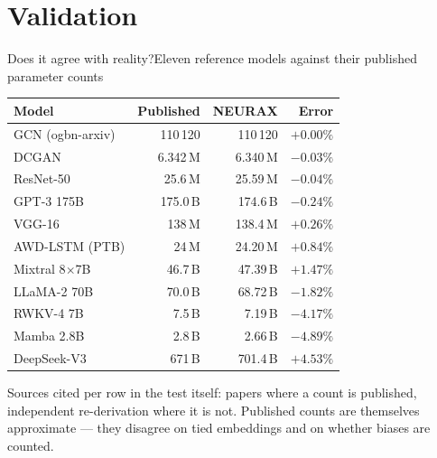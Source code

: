 \documentclass[aspectratio=169,11pt]{beamer}
\newcommand{\good}[1]{\textcolor{nxMoss}{#1}}
\begin{document}
\section{Validation}

\begin{frame}{Does it agree with reality?}{Eleven reference models against their published parameter counts}
  \vspace{0.15cm}
  \begin{center}
  {\footnotesize
  \begin{tabular}{@{}l r r r@{}}
    \toprule
    \textbf{Model} & \textbf{Published} & \textbf{NEURAX} & \textbf{Error} \\
    \midrule
    GCN (ogbn-arxiv) & 110\,120 & 110\,120 & \good{$+0.00\%$} \\
    DCGAN            & 6.342\,M & 6.340\,M & \good{$-0.03\%$} \\
    ResNet-50        & 25.6\,M  & 25.59\,M & \good{$-0.04\%$} \\
    GPT-3 175B       & 175.0\,B & 174.6\,B & \good{$-0.24\%$} \\
    VGG-16           & 138\,M   & 138.4\,M & \good{$+0.26\%$} \\
    AWD-LSTM (PTB)   & 24\,M    & 24.20\,M & \good{$+0.84\%$} \\
    Mixtral 8$\times$7B & 46.7\,B & 47.39\,B & \good{$+1.47\%$} \\
    LLaMA-2 70B      & 70.0\,B  & 68.72\,B & \good{$-1.82\%$} \\
    RWKV-4 7B        & 7.5\,B   & 7.19\,B  & $-4.17\%$ \\
    Mamba 2.8B       & 2.8\,B   & 2.66\,B  & $-4.89\%$ \\
    DeepSeek-V3      & 671\,B   & 701.4\,B & $+4.53\%$ \\
    \bottomrule
  \end{tabular}}
  \end{center}

  \vspace{0.25cm}
  \begin{center}\begin{minipage}{0.88\linewidth}
    {\scriptsize\color{nxSlate}Sources cited per row in the test itself:
    papers where a count is published, independent re-derivation where it is
    not. Published counts are themselves approximate --- they disagree on tied
    embeddings and on whether biases are counted.}
  \end{minipage}\end{center}
\end{frame}
\end{document}
